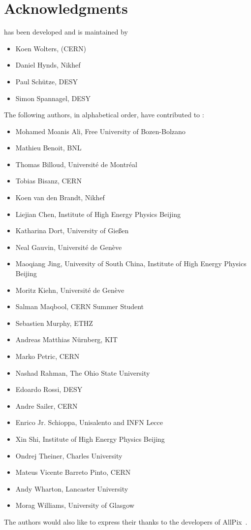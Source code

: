 \chapter{Acknowledgments}

\apsq has been developed and is maintained by

\begin{itemize}
\item Koen Wolters, (CERN)
\item Daniel Hynds, Nikhef
\item Paul Schütze, DESY
\item Simon Spannagel, DESY
\end{itemize}

The following authors, in alphabetical order, have contributed to \apsq:

\begin{itemize}
\item Mohamed Moanis Ali, Free University of Bozen-Bolzano
\item Mathieu Benoit, BNL
\item Thomas Billoud, Université de Montréal
\item Tobias Bisanz, CERN
\item Koen van den Brandt, Nikhef
\item Liejian Chen, Institute of High Energy Physics Beijing
\item Katharina Dort, University of Gie\ss en
\item Neal Gauvin, Université de Genève
\item Maoqiang Jing, University of South China, Institute of High Energy Physics Beijing
\item Moritz Kiehn, Université de Genève
\item Salman Maqbool, CERN Summer Student
\item Sebastien Murphy, ETHZ
\item Andreas Matthias Nürnberg, KIT
\item Marko Petric, CERN
\item Nashad Rahman, The Ohio State University
\item Edoardo Rossi, DESY
\item Andre Sailer, CERN
\item Enrico Jr. Schioppa, Unisalento and INFN Lecce
\item Xin Shi, Institute of High Energy Physics Beijing
\item Ondrej Theiner, Charles University
\item Mateus Vicente Barreto Pinto, CERN
\item Andy Wharton, Lancaster University
\item Morag Williams, University of Glasgow
\end{itemize}

The authors would also like to express their thanks to the developers of AllPix~\cite{ap1wiki,ap1git}.
